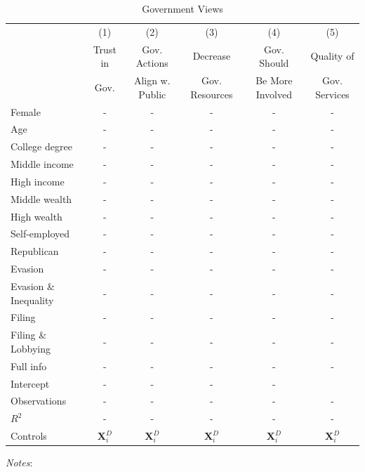\documentclass[11pt]{article}
\begin{document}
\begin{table}[!htbp]\centering
\caption{Government Views}
\label{tab:government_views}
\begin{threeparttable}
\begin{tabular}{lccccc}
\toprule
 & (1) & (2) & (3) & (4) & (5)  \\
 & Trust in & Gov. Actions& Decrease &Gov. Should & Quality of  \\
 & Gov. &  Align w. Public & Gov. Resources & Be More Involved & Gov. Services\\
\midrule
Female                     &-& - & -& -& - \\
Age                        &-& - & -& -& - \\
College degree             &-& - & -& -& - \\
Middle income              &-& - & -& -& - \\
High income                &-& - & -& -& - \\
Middle wealth              &-& - & -& -& - \\
High wealth                &-& - & -& -& - \\
Self-employed              &-& - & -& -& - \\
Republican                 &-& - & -& -& - \\[0.5em]
Evasion              &-& - & -& -& - \\
Evasion \& Inequality&-& - & -& -& - \\
Filing               &-& - & -& -& - \\
Filing \& Lobbying   &-& - & -& -& - \\
Full info            &-& - & -& -& - \\[0.5em]
Intercept              &   -& -   & -& -  \\
\midrule
Observations               &-        &-        &-& - & -      \\
$R^2$                      &-        &-        &-& - & -      \\
Controls                   &$\mathbf{X}_i^{D}$&$\mathbf{X}_i^{D}$&$\mathbf{X}_i^{D}$&$\mathbf{X}_i^{D}$&$\mathbf{X}_i^{D}$\\
\bottomrule
\end{tabular}
\begin{tablenotes}[flushleft]
\footnotesize
\item \textit{Notes}: 
\end{tablenotes}
\end{threeparttable}
\end{table}
\end{document}
